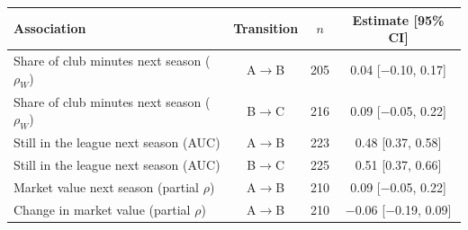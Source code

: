 \begin{tabular}{lccc}
\toprule
Association & Transition & $n$ & Estimate [95\% CI] \\
\midrule
Share of club minutes next season ($\rho_W$) & A$\to$B & 205 & 0.04 [$-$0.10, 0.17] \\
Share of club minutes next season ($\rho_W$) & B$\to$C & 216 & 0.09 [$-$0.05, 0.22] \\
Still in the league next season (AUC) & A$\to$B & 223 & 0.48 [0.37, 0.58] \\
Still in the league next season (AUC) & B$\to$C & 225 & 0.51 [0.37, 0.66] \\
Market value next season (partial $\rho$) & A$\to$B & 210 & 0.09 [$-$0.05, 0.22] \\
Change in market value (partial $\rho$) & A$\to$B & 210 & $-$0.06 [$-$0.19, 0.09] \\
\bottomrule
\end{tabular}
